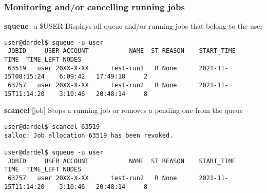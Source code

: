 \begin{frame}[fragile]
\frametitle{Monitoring and/or cancelling running jobs }
\begin{alertblock}{\textbf{squeue} -u  \$USER}
  Displays all queue and/or running jobs that belong to the user
\tiny
  \begin{verbatim}
user@dardel$ squeue -u user
 JOBID     USER ACCOUNT           NAME  ST REASON    START_TIME                TIME  TIME_LEFT NODES
 63519   user 20XX-X-XX      test-run1   R None      2021-11-15T08:15:24    6:09:42   17:49:18     2
 63757   user 20XX-X-XX      test-run2   R None      2021-11-15T11:14:20    3:10:46   20:48:14     8
  \end{verbatim}
\end{alertblock}

\begin{alertblock}{\textbf{scancel} [job]}
Stops a running job or removes a pending one from the queue
\tiny
  \begin{verbatim}
user@dardel$ scancel 63519
salloc: Job allocation 63519 has been revoked.

user@dardel$ squeue -u user
 JOBID     USER ACCOUNT           NAME  ST REASON    START_TIME                TIME  TIME_LEFT NODES
 63757   user 20XX-X-XX      test-run2   R None      2021-11-15T11:14:20    3:10:46   20:48:14     8
  \end{verbatim}
\end{alertblock}
\end{frame}
